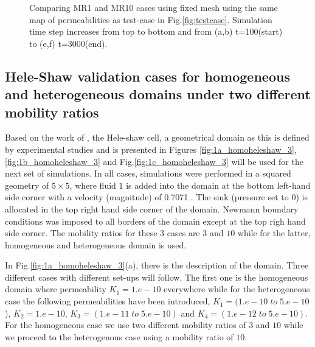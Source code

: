 \documentclass[preprint,authoryear,12pt]{elsarticle}
\begin{document}
\begin{figure}[h]
{{}%
\hfill    
{}}%
\caption{Comparing MR1 and MR10 cases using fixed mesh using the same map of permeabilities as test-case in Fig.\ref{fig:testcase}. Simulation time step increases from top to bottom and from (a,b) t=100(start) to (e,f) t=3000(end).}
\label{fig:1testcase}
\end{figure}

\subsection{Hele-Shaw validation cases for homogeneous and heterogeneous domains under two different mobility ratios}

\medskip
Based on the work of \citet{saffman_1986}, the Hele-shaw cell, a geometrical domain as this is defined by experimental studies and is presented in Figures \ref{fig:1a_homoheleshaw_3},\ref{fig:1b_homoheleshaw_3} and Fig.\ref{fig:1c_homoheleshaw_3} will be used for the next set of simulations. In all cases, simulations were performed in a squared geometry of $5\times5$, where fluid $1$ is added into the domain at the bottom left-hand side corner with a velocity (magnitude) of 0.7071 %
. The sink (pressure set to $0$) is allocated in the top right hand side corner of the domain. Newmann boundary conditions %
was imposed to all borders of the domain except at the top righ hand side corner. The mobility ratios for these $3$ cases are $3$ and $10$ while for the latter, homogeneous and heterogeneous domain is used.

\medskip
In Fig.\ref{fig:1a_homoheleshaw_3}(a), there is the description of the domain. Three different cases with different set-ups will follow. The first one is the homogeneous domain where permeability $K_{1}=1.e-10$ everywhere while for the heterogeneous case the following permeabilities have been introduced, $K_{1}=(1.e-10 \;to\; 5.e-10$), $K_{2}=1.e-10$, $K_{3}=(1.e-11 \;to\; 5.e-10)$ and $K_{4}=(1.e-12 \;to\; 5.e-10)$. For the homogeneous case we use two different mobility ratios of $3$ and $10$ while we proceed to the heterogenous case using a mobility ratio of $10$. 
\end{document}
